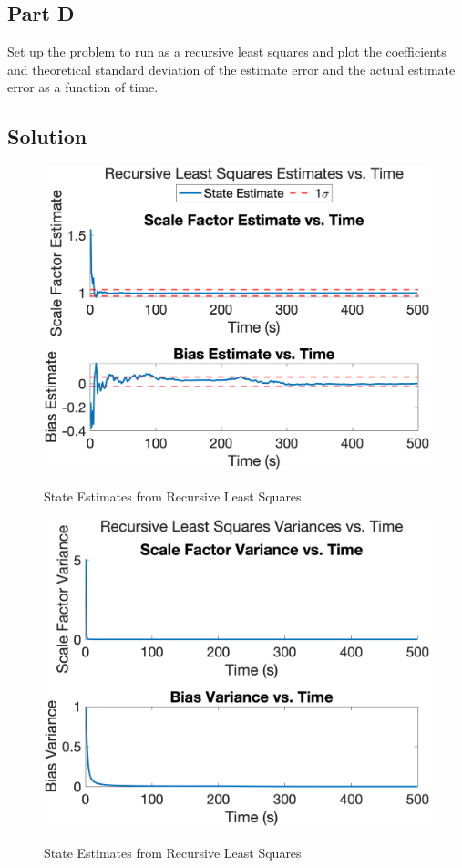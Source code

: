 \documentclass{article}
\begin{document}
\subsection*{Part D}
Set up the problem to run as a recursive least squares and plot the coefficients and theoretical standard deviation of the estimate error and 
the actual estimate error as a function of time.
\subsection*{Solution}
\begin{figure}[H]
    \centering
    \includegraphics[width=0.75\linewidth]{../figures/p3d_state.png}\label{fig:p3d_state}
    \caption{State Estimates from Recursive Least Squares}
\end{figure}
\begin{figure}[H]
    \centering
    \includegraphics[width=0.75\linewidth]{../figures/p3d_variance.png}\label{fig:p3d_variance}
    \caption{State Estimates from Recursive Least Squares}
\end{figure}
\end{document}
